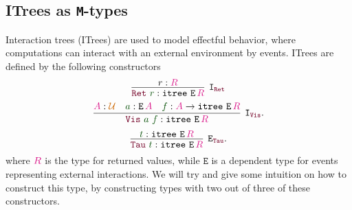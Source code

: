 \documentclass[twoside,11pt,openright]{report}
\theoremstyle{plain} %
\theoremstyle{definition}
\theoremstyle{remark}
\newcommand*{\term}[1]{\textcolor{green!30!black}{#1}} %
\newcommand*{\type}[1]{\textcolor{magenta!90!black}{#1}}
\newcommand*{\universe}[1]{\textcolor{orange!80!black}{#1}}
\newcommand*{\constructor}[1]{\textcolor{purple!60!black}{\ensuremath{\mathtt{#1}}}}
\newcommand*{\typeformer}[1]{\ensuremath{\mathtt{#1}}}
\begin{document}
\subsection{ITrees as \texttt{M}-types}
Interaction trees (ITrees) \cite{DBLP:itrees} are used to model effectful behavior, where computations can interact with an external environment by events. ITrees are defined by the following constructors
\begin{equation}
  \vcenter{\infer[\mathtt{I}_{\constructor{Ret}}]{\constructor{Ret}~\term{r} : \typeformer{itree}~\typeformer{E}\,\type{R}}{r : \type{R}}}
\end{equation}
\begin{equation}
  \vcenter{\infer[\mathtt{I}_{\constructor{Vis}}]{\constructor{Vis}~\term{a}~\term{f} : \typeformer{itree}~\typeformer{E}\,\type{R}}{\type{A} : \universe{\mathcal{U}} & \term{a} : \typeformer{E}\,\type{A} & \term{f} : \type{A} \rightarrow \typeformer{itree}~\typeformer{E}\,\type{R}}}.
\end{equation}
\begin{equation}
  \vcenter{\infer[\mathtt{E}_{\constructor{Tau}}]{\constructor{Tau}~\term{t} : \typeformer{itree}~\typeformer{E}\,\type{R}}{\term{t} : \typeformer{itree}~\typeformer{E}\,\type{R}}}.
\end{equation}
where \(\type{R}\) is the type for returned values, while \(\typeformer{E}\) is a dependent type for events representing external interactions. We will try and give some intuition on how to construct this type, by constructing types with two out of three of these constructors.
\end{document}
